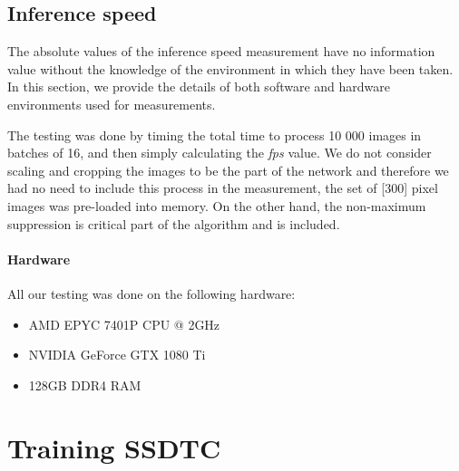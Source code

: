 \subsection{Inference speed}
The absolute values of the inference speed measurement have no information value without the knowledge of the environment in which they have been taken. In this section, we provide the details of both software and hardware environments used for measurements.

The testing was done by timing the total time to process 10 000 images in batches of 16, and then simply calculating the \textit{fps} value. We do not consider scaling and cropping the images to be the part of the network and therefore we had no need to include this process in the measurement, the set of [300] pixel images was pre-loaded into memory. On the other hand, the non-maximum suppression is critical part of the algorithm and is included. 

\paragraph{Hardware} All our testing was done on the following hardware:
\begin{itemize}
    \item AMD EPYC 7401P CPU @ 2GHz 
    \item NVIDIA GeForce GTX 1080 Ti
    \item 128GB DDR4 RAM
\end{itemize}

\section{Training SSDTC}